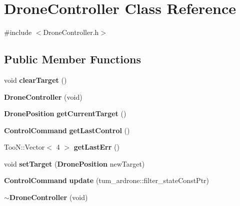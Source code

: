 \section{Drone\-Controller Class Reference}
\label{classDroneController}


{\ttfamily \#include $<$Drone\-Controller.\-h$>$}

\subsection*{Public Member Functions}
\begin{DoxyCompactItemize}
\item 
void {\bf clear\-Target} ()
\item 
{\bf Drone\-Controller} (void)
\item 
{\bf Drone\-Position} {\bf get\-Current\-Target} ()
\item 
{\bf Control\-Command} {\bf get\-Last\-Control} ()
\item 
Too\-N\-::\-Vector$<$ 4 $>$ {\bf get\-Last\-Err} ()
\item 
void {\bf set\-Target} ({\bf Drone\-Position} new\-Target)
\item 
{\bf Control\-Command} {\bf update} (tum\-\_\-ardrone\-::filter\-\_\-state\-Const\-Ptr)
\item 
{\bf $\sim$\-Drone\-Controller} (void)
\end{DoxyCompactItemize}
